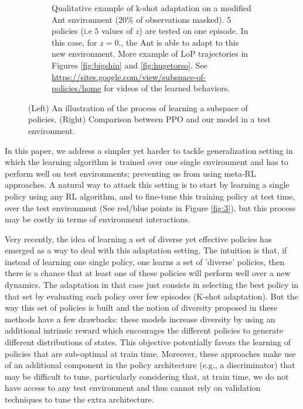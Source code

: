 \begin{figure}[t]
\begin{subfigure}{.5\textwidth}
        \caption{Qualitative example of k-shot adaptation on a modified Ant environment (20\% of observations masked). 5 policies (i.e $5$ values of $z$) are tested on one episode. In this case, for $z=0.$, the Ant is able to adapt to this new environment. More example of LoP trajectories in Figures \ref{fig:bigshin} and \ref{fig:hugetorso}. See \url{https://sites.google.com/view/subspace-of-policies/home} for videos of the learned behaviors.}
         \label{fig:k-shot_ant}
    \end{subfigure}
    \vspace{-0.3cm}
    \caption{(Left) An illustration of the process of learning a subspace of policies. (Right) Comparison between PPO and our model in a test environment.}
    \vspace{-0.6cm}
\end{figure}

In this paper, we address a simpler yet harder to tackle generalization setting in which the learning algorithm is trained over one single environment and has to perform well on test environments; preventing us from using meta-RL approaches. A natural way to attack this setting is to start by learning a single policy using any RL algorithm, and to fine-tune this training policy at test time, over the test environment (See red/blue points in Figure \ref{fig:3}), but this process may be costly in terms of environment interactions.

Very recently, the idea of learning a set of diverse yet effective policies  \citep{SMERL,Tokyo} has emerged as a way to deal with this adaptation setting. The intuition is that, if instead of learning one single policy, one learns a set of 'diverse' policies, then there is a chance that at least one of these policies will perform well over a new dynamics. The adaptation in that case just consists in selecting the best policy in that set by evaluating each policy over few episodes (K-shot adaptation).
But the way this set of policies is built and the notion of diversity proposed in these methods have a few drawbacks: these models increase diversity by using an additional intrinsic reward which encourages the different policies to generate different distributions of states. This objective potentially favors the learning of policies that are sub-optimal at train time. Moreover, these approaches make use of an additional component in the policy architecture (e.g., a discriminator) that may be difficult to tune, particularly considering that, at train time, we do not have access to any test environment and thus cannot rely on validation techniques to tune the extra architecture.

